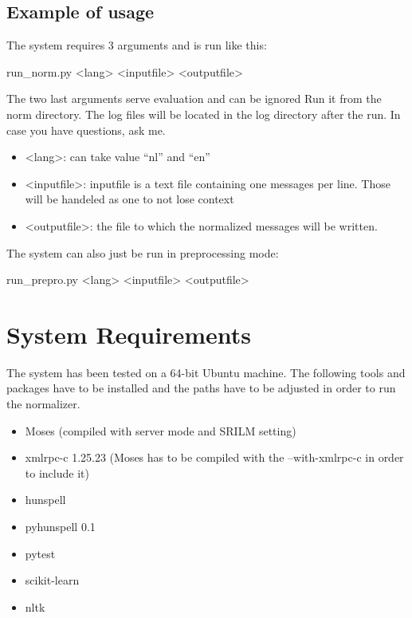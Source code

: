 \documentclass[letterpaper,10pt,english]{sphinxmanual}
\begin{document}
\section{Example of usage}
\label{README:example-of-usage}
The system requires 3 arguments and is run like this:

run\_norm.py \textless{}lang\textgreater{} \textless{}inputfile\textgreater{} \textless{}outputfile\textgreater{}

The two last arguments serve evaluation and can be ignored
Run it from the norm directory. The log files will be located in the log directory after the run.
In case you have questions, ask me.
\begin{itemize}
\item {} 
\textless{}lang\textgreater{}:       can take value ``nl'' and ``en''

\item {} 
\textless{}inputfile\textgreater{}:  inputfile is a text file containing one messages per line. Those will be handeled as one to not lose context

\item {} 
\textless{}outputfile\textgreater{}: the file to which the normalized messages will be written.

\end{itemize}

The system can also just be run in preprocessing mode:

run\_prepro.py \textless{}lang\textgreater{} \textless{}inputfile\textgreater{} \textless{}outputfile\textgreater{}


\chapter{System Requirements}
\label{README:system-requirements}
The system has been tested on a 64-bit Ubuntu machine.
The following tools and packages have to be installed and the paths have to be adjusted in order to run the normalizer.
\begin{itemize}
\item {} 
Moses (compiled with server mode and SRILM setting)

\item {} 
xmlrpc-c 1.25.23 (Moses has to be compiled with the --with-xmlrpc-c in order to include it)

\item {} 
hunspell

\item {} 
pyhunspell 0.1

\item {} 
pytest

\item {} 
scikit-learn

\item {} 
nltk

\end{itemize}
\end{document}
